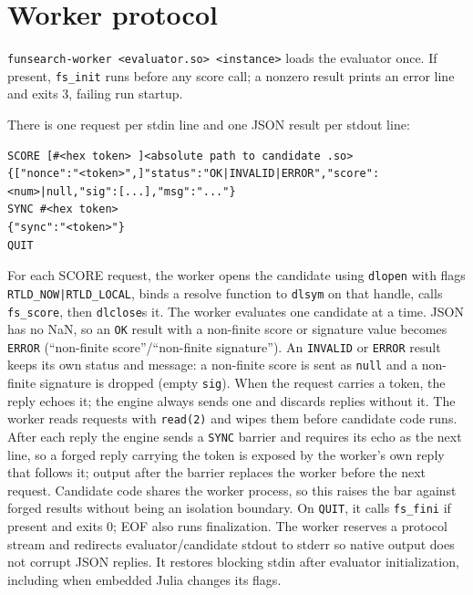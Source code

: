 \documentclass[11pt]{article}
\newcommand{\code}[1]{\texttt{#1}}
\begin{document}
\section{Worker protocol}
\code{funsearch-worker <evaluator.so> <instance>} loads the evaluator once.
If present, \code{fs\_init} runs before any score call; a nonzero result prints
an error line and exits 3, failing run startup.

There is one request per stdin line and one JSON result per stdout line:
\begin{lstlisting}
SCORE [#<hex token> ]<absolute path to candidate .so>
{["nonce":"<token>",]"status":"OK|INVALID|ERROR","score":<num>|null,"sig":[...],"msg":"..."}
SYNC #<hex token>
{"sync":"<token>"}
QUIT
\end{lstlisting}
For each SCORE request, the worker opens the candidate using
\code{dlopen} with flags \code{RTLD\_NOW|RTLD\_LOCAL}, binds a resolve function to
\code{dlsym} on that handle, calls \code{fs\_score}, then \code{dlclose}s it.
The worker evaluates one candidate at a time. JSON has no NaN, so an
\code{OK} result with a non-finite score or signature value becomes
\code{ERROR} (``non-finite score''/``non-finite signature''). An
\code{INVALID} or \code{ERROR} result keeps its own status and message: a
non-finite score is sent as \code{null} and a non-finite signature is dropped
(empty \code{sig}). When the request carries a token, the reply echoes it; the
engine always sends one and discards replies without it. The worker reads
requests with \code{read(2)} and wipes them before candidate code runs. After
each reply the engine sends a \code{SYNC} barrier and requires its echo as the
next line, so a forged reply carrying the token is exposed by the worker's own
reply that follows it; output after the barrier replaces the worker before the
next request. Candidate code shares the worker process, so this raises the bar
against forged results without being an isolation boundary. On \code{QUIT}, it calls
\code{fs\_fini} if present and exits 0; EOF also runs finalization. The worker
reserves a protocol stream and redirects evaluator/candidate stdout to stderr
so native output does not corrupt JSON replies. It restores blocking stdin
after evaluator initialization, including when embedded Julia changes its flags.
\end{document}
